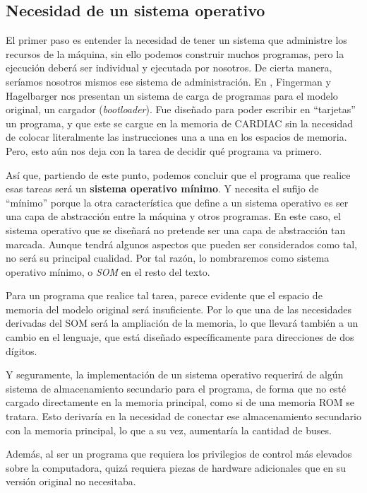 \documentclass[letterpaper,12pt,oneside]{book}
\begin{document}
	
	
		\subsection{Necesidad de un sistema operativo}
		
		El primer paso es entender la necesidad de tener un sistema que administre los recursos de la máquina, sin ello podemos construir muchos programas, pero
		la ejecución deberá ser individual y ejecutada por nosotros. De cierta manera, seríamos nosotros mismos ese sistema de administración. En 
		\cite[p. 42]{fingerman_instruction_1968}, Fingerman y Hagelbarger
		nos presentan un sistema de carga de programas para el modelo original, un cargador (\textit{bootloader}). Fue diseñado para poder escribir en 
		``tarjetas'' un programa, y que este se cargue en
		la memoria de CARDIAC sin la necesidad de colocar literalmente las instrucciones una a una en los espacios de memoria. Pero, esto 
		aún nos deja
		con la tarea de decidir qué programa va primero.
  
        Así que, partiendo de este punto, podemos concluir que el programa que realice esas tareas será un \textbf{sistema
		operativo mínimo}. Y necesita el sufijo de ``mínimo'' porque la otra característica que define
		a un sistema operativo es ser una capa de abstracción entre la máquina y otros programas. En este
		caso, el sistema operativo que se diseñará no pretende ser una capa de abstracción tan marcada. Aunque tendrá algunos aspectos que pueden ser considerados como tal, no será su principal cualidad. Por tal razón, lo nombraremos como sistema operativo mínimo, o \textit{SOM} en el resto del texto.
		
		Para un programa que realice tal tarea, parece evidente que el espacio de memoria del modelo original será insuficiente. Por lo que una de las necesidades
		derivadas del SOM será la ampliación de la memoria, lo que llevará también a un cambio en el lenguaje, que está diseñado específicamente para direcciones de dos 
		dígitos.
  
        Y seguramente, la implementación de un sistema operativo requerirá de algún sistema de almacenamiento secundario para el programa, de forma que 
        no esté
		cargado directamente en la memoria principal, como si de una memoria ROM se tratara. Esto derivaría en la necesidad de conectar ese almacenamiento secundario
		con la memoria principal, lo que a su vez, aumentaría la cantidad de buses.
  
        Además, al ser un programa que requiera los privilegios de control más elevados sobre la computadora,
		quizá requiera piezas de hardware adicionales que en su versión original no necesitaba.
		
\end{document}
